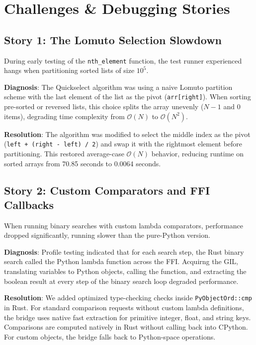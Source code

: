 \documentclass[11pt,a4paper]{article}
\begin{document}
\newpage

\section{Challenges \& Debugging Stories}

\subsection{Story 1: The Lomuto Selection Slowdown}
During early testing of the \texttt{nth\_element} function, the test runner experienced hangs when partitioning sorted lists of size $10^5$. 

\textbf{Diagnosis}: The Quickselect algorithm was using a naive Lomuto partition scheme with the last element of the list as the pivot (\texttt{arr[right]}). When sorting pre-sorted or reversed lists, this choice splits the array unevenly ($N-1$ and $0$ items), degrading time complexity from $\mathcal{O}(N)$ to $\mathcal{O}(N^2)$.

\textbf{Resolution}: The algorithm was modified to select the middle index as the pivot (\texttt{left + (right - left) / 2}) and swap it with the rightmost element before partitioning. This restored average-case $\mathcal{O}(N)$ behavior, reducing runtime on sorted arrays from 70.85 seconds to 0.0064 seconds.

\subsection{Story 2: Custom Comparators and FFI Callbacks}
When running binary searches with custom lambda comparators, performance dropped significantly, running slower than the pure-Python version.

\textbf{Diagnosis}: Profile testing indicated that for each search step, the Rust binary search called the Python lambda function across the FFI. Acquirng the GIL, translating variables to Python objects, calling the function, and extracting the boolean result at every step of the binary search loop degraded performance.

\textbf{Resolution}: We added optimized type-checking checks inside \texttt{PyObjectOrd::cmp} in Rust. For standard comparison requests without custom lambda definitions, the bridge uses native fast extraction for primitive integer, float, and string keys. Comparisons are computed natively in Rust without calling back into CPython. For custom objects, the bridge falls back to Python-space operations.
\end{document}
